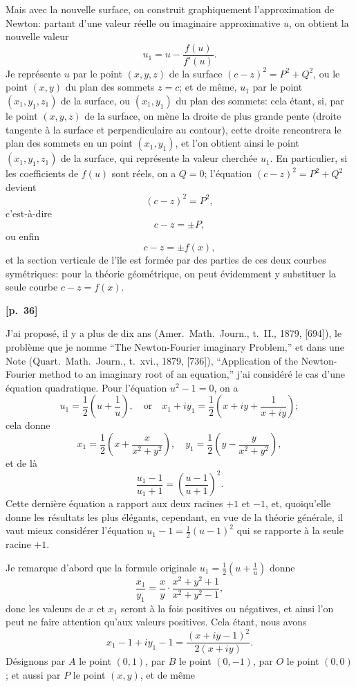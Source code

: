 \documentclass[11pt,a4paper]{book}
\begin{document}
Mais avec la nouvelle surface, on construit graphiquement l'approximation de Newton: partant d'une valeur r\'eelle ou imaginaire approximative $u$, on obtient la nouvelle valeur
$$
u_1 = u - \frac{f(u)}{f'(u)}.
$$
Je repr\'esente $u$ par le point $(x, y, z)$ de la surface $(c - z)^2 = P^2 + Q^2$, ou le point $(x, y)$ du plan des sommets $z = c$; et de m\^eme, $u_1$ par le point $(x_1, y_1, z_1)$ de la surface, ou $(x_1, y_1)$ du plan des sommets: cela \'etant, si, par le point $(x, y, z)$ de la surface, on m\`ene la droite de plus grande pente (droite tangente \`a la surface et perpendiculaire au contour), cette droite rencontrera le plan des sommets en un point $(x_1, y_1)$, et l'on obtient ainsi le point $(x_1, y_1, z_1)$ de la surface, qui repr\'esente la valeur cherch\'ee $u_1$. En particulier, si les coefficients de $f(u)$ sont r\'eels, on a $Q = 0$; l'\'equation $(c - z)^2 = P^2 + Q^2$ devient
$$
(c - z)^2 = P^2,
$$
c'est-\`a-dire
$$
c - z = \pm P,
$$
ou enfin
$$
c - z = \pm f(x),
$$
et la section verticale de l'\^ile est form\'ee par des parties de ces deux courbes sym\'etriques: pour la th\'eorie g\'eom\'etrique, on peut \'evidemment y substituer la seule courbe $c - z = f(x)$.

\vspace{0.5em}
\noindent\textbf{[p.\ 36]}

J'ai propos\'e, il y a plus de dix ans (Amer.\ Math.\ Journ., t.\ II., 1879, [694]), le probl\`eme que je nomme ``The Newton-Fourier imaginary Problem,'' et dans une Note (Quart.\ Math.\ Journ., t.\ xvi., 1879, [736]), ``Application of the Newton-Fourier method to an imaginary root of an equation,'' j'ai consid\'er\'e le cas d'une \'equation quadratique. Pour l'\'equation $u^2 - 1 = 0$, on a
$$
u_1 = \frac{1}{2}\left(u + \frac{1}{u}\right), \quad \text{or} \quad x_1 + iy_1 = \frac{1}{2}\left(x + iy + \frac{1}{x + iy}\right);
$$
cela donne
$$
x_1 = \frac{1}{2}\left(x + \frac{x}{x^2 + y^2}\right), \quad y_1 = \frac{1}{2}\left(y - \frac{y}{x^2 + y^2}\right),
$$
et de l\`a
$$
\frac{u_1 - 1}{u_1 + 1} = \left(\frac{u - 1}{u + 1}\right)^2.
$$
Cette derni\`ere \'equation a rapport aux deux racines $+1$ et $-1$, et, quoiqu'elle donne les r\'esultats les plus \'el\'egants, cependant, en vue de la th\'eorie g\'en\'erale, il vaut mieux consid\'erer l'\'equation $u_1 - 1 = \frac{1}{2}(u - 1)^2$ qui se rapporte \`a la seule racine $+1$.

Je remarque d'abord que la formule originale $u_1 = \frac{1}{2}(u + \frac{1}{u})$ donne
$$
\frac{x_1}{y_1} = \frac{x}{y} \cdot \frac{x^2 + y^2 + 1}{x^2 + y^2 - 1},
$$
donc les valeurs de $x$ et $x_1$ seront \`a la fois positives ou n\'egatives, et ainsi l'on peut ne faire attention qu'aux valeurs positives. Cela \'etant, nous avons
$$
x_1 - 1 + i y_1 - 1 = \frac{(x + iy - 1)^2}{2(x + iy)}.
$$
D\'esignons par $A$ le point $(0, 1)$, par $B$ le point $(0, -1)$, par $O$ le point $(0, 0)$; et aussi par $P$ le point $(x, y)$, et de m\^eme
\end{document}
